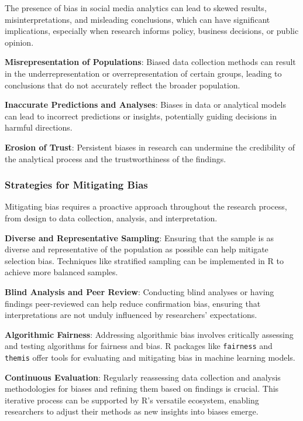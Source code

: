\documentclass[
]{book}
\begin{document}
The presence of bias in social media analytics can lead to skewed results, misinterpretations, and misleading conclusions, which can have significant implications, especially when research informs policy, business decisions, or public opinion.

\textbf{Misrepresentation of Populations}: Biased data collection methods can result in the underrepresentation or overrepresentation of certain groups, leading to conclusions that do not accurately reflect the broader population.

\textbf{Inaccurate Predictions and Analyses}: Biases in data or analytical models can lead to incorrect predictions or insights, potentially guiding decisions in harmful directions.

\textbf{Erosion of Trust}: Persistent biases in research can undermine the credibility of the analytical process and the trustworthiness of the findings.

\hypertarget{strategies-for-mitigating-bias}{%
\subsubsection*{Strategies for Mitigating Bias}\label{strategies-for-mitigating-bias}}

Mitigating bias requires a proactive approach throughout the research process, from design to data collection, analysis, and interpretation.

\textbf{Diverse and Representative Sampling}: Ensuring that the sample is as diverse and representative of the population as possible can help mitigate selection bias. Techniques like stratified sampling can be implemented in R to achieve more balanced samples.

\textbf{Blind Analysis and Peer Review}: Conducting blind analyses or having findings peer-reviewed can help reduce confirmation bias, ensuring that interpretations are not unduly influenced by researchers' expectations.

\textbf{Algorithmic Fairness}: Addressing algorithmic bias involves critically assessing and testing algorithms for fairness and bias. R packages like \texttt{fairness} and \texttt{themis} offer tools for evaluating and mitigating bias in machine learning models.

\textbf{Continuous Evaluation}: Regularly reassessing data collection and analysis methodologies for biases and refining them based on findings is crucial. This iterative process can be supported by R's versatile ecosystem, enabling researchers to adjust their methods as new insights into biases emerge.
\end{document}
